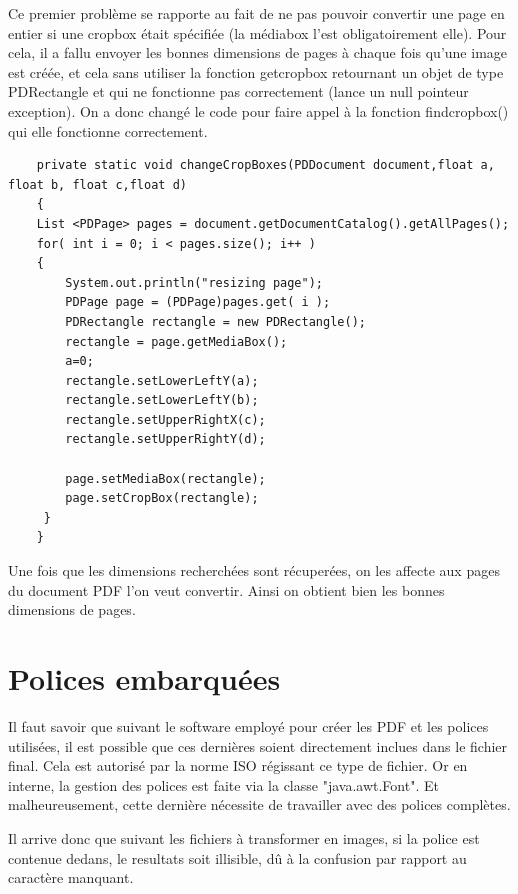 Ce premier problème se rapporte au fait de ne pas pouvoir convertir
une page en entier si une cropbox était spécifiée (la médiabox l'est 
obligatoirement elle). Pour cela, il a fallu envoyer les bonnes dimensions 
de pages à chaque fois qu'une image est créée, et cela sans utiliser la fonction
getcropbox retournant un objet de type PDRectangle et qui ne fonctionne 
pas correctement (lance un null pointeur exception). On a donc changé le
code pour faire appel à la fonction findcropbox() qui elle fonctionne 
    correctement.


    \lstset{language=Java}
    \begin{lstlisting} 
    private static void changeCropBoxes(PDDocument document,float a, float b, float c,float d)
    {
	List <PDPage> pages = document.getDocumentCatalog().getAllPages();
	for( int i = 0; i < pages.size(); i++ )
	{
        System.out.println("resizing page");
        PDPage page = (PDPage)pages.get( i );
        PDRectangle rectangle = new PDRectangle();
        rectangle = page.getMediaBox();
        a=0;
        rectangle.setLowerLeftY(a);
        rectangle.setLowerLeftY(b);
        rectangle.setUpperRightX(c);
        rectangle.setUpperRightY(d);

        page.setMediaBox(rectangle);
        page.setCropBox(rectangle);
	 }
    }
    \end{lstlisting}

Une fois que les dimensions recherchées sont récuperées, on les affecte
aux pages du document PDF l'on veut convertir. Ainsi on obtient bien les bonnes 
dimensions de pages.

    \section{Polices embarquées}

Il faut savoir que suivant le software employé pour créer les PDF et
les polices utilisées, il est possible que ces dernières soient directement
inclues dans le fichier final. Cela est autorisé par la norme ISO régissant 
ce type de fichier. Or en interne, la gestion des polices est faite via la 
classe "java.awt.Font". Et malheureusement, cette dernière nécessite de travailler
avec des polices complètes.

Il arrive donc que suivant les fichiers à transformer en images, si la police 
est contenue dedans, le resultats soit illisible, dû à la confusion par rapport
au caractère manquant.

